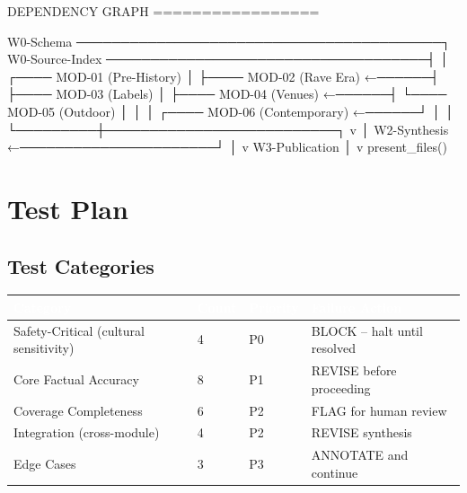 \documentclass[11pt,letterpaper]{article}
\newcommand{\tableheader}[1]{\textbf{\sffamily\textcolor{white}{#1}}}
\begin{document}
\begin{asciibox}
DEPENDENCY GRAPH
=================

W0-Schema ─────────────────────────────────────────┐
W0-Source-Index ────────────────────────────────────┤
                                                    │
              ┌──── MOD-01 (Pre-History)            │
              ├──── MOD-02 (Rave Era)        ←──────┤
              ├──── MOD-03 (Labels)                 │
              ├──── MOD-04 (Venues)          ←──────┤
              └──── MOD-05 (Outdoor)                │
                         │                          │
              ┌──── MOD-06 (Contemporary)    ←──────┘
              │         │
              └─────────┼──────────────────────────┐
                        v                          │
               W2-Synthesis ←──────────────────────┘
                        │
                        v
               W3-Publication
                        │
                        v
                 present_files()
\end{asciibox}

\section{Test Plan}

\subsection{Test Categories}

\begin{center}
\begin{tabularx}{\textwidth}{L{3.5cm}C{1.5cm}C{1.5cm}X}
\toprule
{}
\tableheader{Category} & \tableheader{Count} & \tableheader{Priority} & \tableheader{Failure Action} \\
\midrule
Safety-Critical (cultural sensitivity) & 4 & P0 & BLOCK -- halt until resolved \\
Core Factual Accuracy & 8 & P1 & REVISE before proceeding \\
Coverage Completeness & 6 & P2 & FLAG for human review \\
Integration (cross-module) & 4 & P2 & REVISE synthesis \\
Edge Cases & 3 & P3 & ANNOTATE and continue \\
\bottomrule
\end{tabularx}
\end{center}
\end{document}
